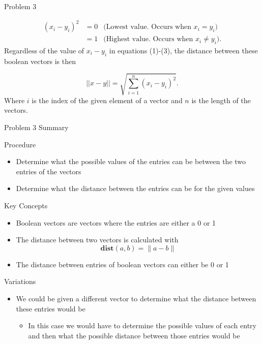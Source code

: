 \begin{problem}{Problem 3}
\begin{highlight}[Solution]
        \begin{align}
            (x_{i} - y_{i})^{2} & = 0 & \text{(Lowest value. Occurs when $x_{i}=y_{i}$)} \\
            & = 1 & \text{(Highest value. Occurs when $x_{i} \neq y_{i}$)}.
        \end{align}
        Regardless of the value of $x_{i} - y_{i}$ in equations (1)-(3), the distance between these boolean vectors is then 

        \begin{equation}
            ||x - y|| = \sqrt{\sum^{n}_{i = 1}(x_{i} - y_{i})^{2}}.
        \end{equation}
        Where $i$ is the index of the given element of a vector and $n$ is the length of the vectors.
    \end{highlight}
\end{problem}

\begin{summary}{Problem 3 Summary}
    \begin{statement}{Procedure}
        \begin{itemize}
            \item Determine what the possible values of the entries can be between the two entries of the vectors
            \item Determine what the distance between the entries can be for the given values
        \end{itemize}
    \end{statement}
    \begin{statement}{Key Concepts}
        \begin{itemize}
            \item Boolean vectors are vectors where the entries are either a 0 or 1
            \item The distance between two vectors is calculated with 
            \begin{equation*}
                \mathbf{dist}(a,b) = \|a - b\|
            \end{equation*}
            \item The distance between entries of boolean vectors can either be 0 or 1
        \end{itemize}
    \end{statement}
    \begin{statement}{Variations}
        \begin{itemize}
            \item We could be given a different vector to determine what the distance between these entries would be
            \begin{itemize}
                \item In this case we would have to determine the possible values of each entry and then what the possible distance between those entries would be
            \end{itemize}
        \end{itemize}
    \end{statement}
\end{summary}

